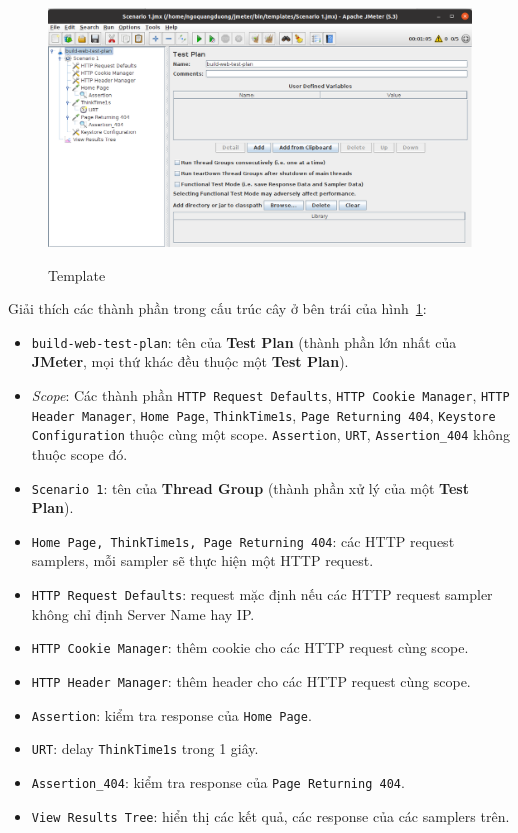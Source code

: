 \documentclass[12pt]{report}
\newcommand{\jmeter}{\textbf{JMeter}}
\begin{document}
\FloatBarrier{}
\begin{figure}[htp]
    \centering
    \includegraphics[scale=0.33]{jmeter-images/template.png}
    \caption{Template}
    {\label{fig:template}}
\end{figure}
\FloatBarrier{}

\par Giải thích các thành phần trong cấu trúc cây ở bên trái của hình~\ref{fig:template}:

\begin{itemize}
    \item \texttt{build-web-test-plan}: tên của \textbf{Test Plan} (thành phần lớn nhất của \jmeter{}, mọi thứ khác đều thuộc một \textbf{Test Plan}).
    \item \textit{Scope}: Các thành phần \texttt{HTTP Request Defaults}, \texttt{HTTP Cookie Manager}, \texttt{HTTP Header Manager}, \texttt{Home Page}, \texttt{ThinkTime1s}, \texttt{Page Returning 404}, \texttt{Keystore Configuration} thuộc cùng một scope. \texttt{Assertion}, \texttt{URT}, \texttt{Assertion\_404} không thuộc scope đó.
    \item \texttt{Scenario 1}: tên của \textbf{Thread Group} (thành phần xử lý của một \textbf{Test Plan}).
    \item \texttt{Home Page, ThinkTime1s, Page Returning 404}: các HTTP request samplers, mỗi sampler sẽ thực hiện một HTTP request.
    \item \texttt{HTTP Request Defaults}: request mặc định nếu các HTTP request sampler không chỉ định Server Name hay IP.\@
    \item \texttt{HTTP Cookie Manager}: thêm cookie cho các HTTP request cùng scope.
    \item \texttt{HTTP Header Manager}: thêm header cho các HTTP request cùng scope.
    \item \texttt{Assertion}: kiểm tra response của \texttt{Home Page}.
    \item \texttt{URT}: delay \texttt{ThinkTime1s} trong 1 giây.
    \item \texttt{Assertion\_404}: kiểm tra response của \texttt{Page Returning 404}.
    \item \texttt{View Results Tree}: hiển thị các kết quả, các response của các samplers trên.
\end{itemize}
\end{document}
